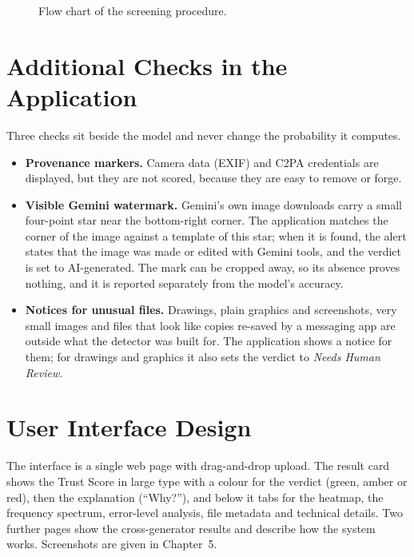 \begin{figure}[htbp]
  \centering
  
  \caption{Flow chart of the screening procedure.}\label{fig:flow}
\end{figure}

\section{Additional Checks in the Application}
Three checks sit beside the model and never change the probability it computes.
\begin{itemize}
  \item \textbf{Provenance markers.} Camera data (EXIF) and C2PA credentials \cite{c2pa} are displayed, but they are not scored, because they are easy to remove or forge.
  \item \textbf{Visible Gemini watermark.} Gemini's own image downloads carry a small four-point star near the bottom-right corner. The application matches the corner of the image against a template of this star; when it is found, the alert states that the image was made or edited with Gemini tools, and the verdict is set to AI-generated. The mark can be cropped away, so its absence proves nothing, and it is reported separately from the model's accuracy.
  \item \textbf{Notices for unusual files.} Drawings, plain graphics and screenshots, very small images and files that look like copies re-saved by a messaging app are outside what the detector was built for. The application shows a notice for them; for drawings and graphics it also sets the verdict to \emph{Needs Human Review}.
\end{itemize}

\section{User Interface Design}
The interface is a single web page with drag-and-drop upload. The result card shows the Trust Score in large type with a colour for the verdict (green, amber or red), then the explanation (``Why?''), and below it tabs for the heatmap, the frequency spectrum, error-level analysis, file metadata and technical details. Two further pages show the cross-generator results and describe how the system works. Screenshots are given in Chapter~5.

